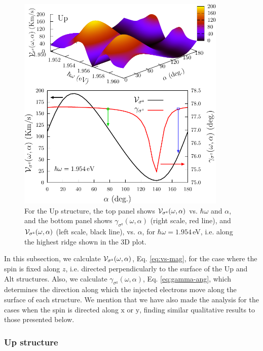 \documentclass[floatfix,prb,aps,superscriptaddress,showpacs,11pt,preprint,letterpaper]{revtex4}
\def\tama{10cm}
\begin{document}
\begin{figure}[t]
\centering
\includegraphics[width=\tama]{upplots/up-vsz-w2}
\caption{For the Up structure, the top panel shows ${\cal V}_{\sigma^\mathrm{z}}
(\omega,\alpha)$ vs. $\hbar\omega$ and $\alpha$, and the bottom panel shows
$\gamma_{\sigma^\mathrm{z}} (\omega,\alpha)$ (right scale, red line), and ${\cal
V}_{\sigma^\mathrm{z}} (\omega,\alpha)$ (left scale, black line), vs. $\alpha$,
for $\hbar\omega=1.954$\,eV, i.e. along the highest ridge shown in the 3D plot.
}
\label{fig:up-vsz-w2}
\end{figure}

In this subsection, we calculate ${\cal V}_{\sigma^\mathrm{z}}(\omega,\alpha)$,
Eq. \eqref{eq:vs-mag}, for the case where the spin is fixed along $z$, i.e.
directed perpendicularly to the surface of the Up and Alt structures. Also, we
calculate $\gamma_{\sigma^\mathrm{z}}(\omega,\alpha)$, Eq. \eqref{eq:gamma-ang},
which determines the direction along which the injected electrons move along the
surface of  each structure. We mention that we have also made the analysis for
the cases when the spin  is directed along $\mathrm{x}$ or $\mathrm{y}$, finding
similar qualitative results to those presented below.

\subsubsection{Up structure}\label{up:fs}
\end{document}
